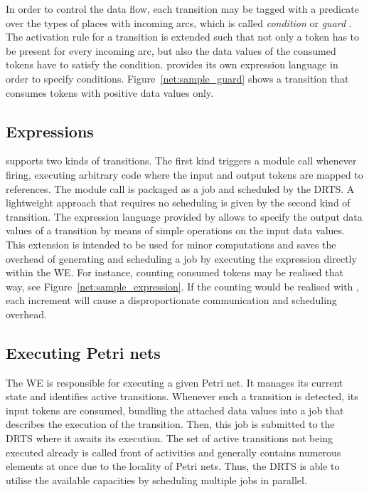 In order to control the data flow, each transition may be tagged with a predicate over the types of places with incoming arcs, which is called \emph{condition} or \emph{guard} \cite{cp_nets}. The activation rule for a transition is extended such that not only a token has to be present for every incoming arc, but also the data values of the consumed tokens have to satisfy the condition. \gpispace{} provides its own expression language in order to specify conditions. Figure~\ref{net:sample_guard} shows a transition that consumes tokens with positive data values only.



\subsection*{Expressions}

\gpispace{} supports two kinds of transitions. The first kind triggers a module call whenever firing, executing arbitrary \cplusplus code where the input and output tokens are mapped to references. The module call is packaged as a job and scheduled by the \ac{DRTS}. A lightweight approach that requires no scheduling is given by the second kind of transition. The expression language provided by \gpispace{} allows to specify the output data values of a transition by means of simple operations on the input data values. This extension is intended to be used for minor computations and saves the overhead of generating and scheduling a job by executing the expression directly within the \ac{WE}. For instance, counting consumed tokens may be realised that way, see Figure~\ref{net:sample_expression}. If the counting would be realised with \cplusplus, each increment will cause a disproportionate communication and scheduling overhead.



\subsection*{Executing Petri nets}

The \ac{WE} is responsible for executing a given Petri net. It manages its current state and identifies active transitions. Whenever such a transition is detected, its input tokens are consumed, bundling the attached data values into a job that describes the execution of the transition. Then, this job is submitted to the \ac{DRTS} where it awaits its execution. The set of active transitions not being executed already is called front of activities and generally contains numerous elements at once due to the locality of Petri nets. Thus, the \ac{DRTS} is able to utilise the available capacities by scheduling multiple jobs in parallel.

